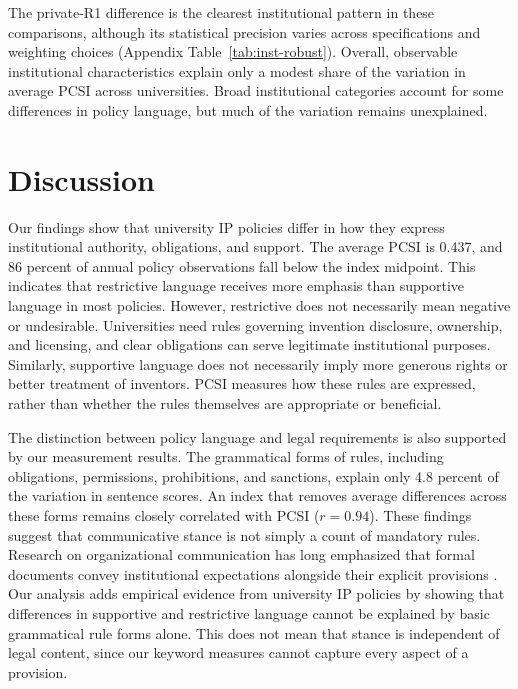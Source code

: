 \documentclass[11pt]{article}
\begin{document}


The private-R1 difference is the clearest institutional pattern in these comparisons, although its statistical precision varies across specifications and weighting choices (Appendix Table~\ref{tab:inst-robust}). Overall, observable institutional characteristics explain only a modest share of the variation in average PCSI across universities. Broad institutional categories account for some differences in policy language, but much of the variation remains unexplained.


\section{Discussion}\label{sec:discussion}

Our findings show that university IP policies differ in how they express institutional authority, obligations, and support. The average PCSI is 0.437, and 86 percent of annual policy observations fall below the index midpoint. This indicates that restrictive language receives more emphasis than supportive language in most policies. However, restrictive does not necessarily mean negative or undesirable. Universities need rules governing invention disclosure, ownership, and licensing, and clear obligations can serve legitimate institutional purposes. Similarly, supportive language does not necessarily imply more generous rights or better treatment of inventors. PCSI measures how these rules are expressed, rather than whether the rules themselves are appropriate or beneficial.

The distinction between policy language and legal requirements is also supported by our measurement results. The grammatical forms of rules, including obligations, permissions, prohibitions, and sanctions, explain only 4.8 percent of the variation in sentence scores. An index that removes average differences across these forms remains closely correlated with PCSI ($r=0.94$). These findings suggest that communicative stance is not simply a count of mandatory rules. Research on organizational communication has long emphasized that formal documents convey institutional expectations alongside their explicit provisions \citep{cooren2004textual,fairhurst2004organizations}. Our analysis adds empirical evidence from university IP policies by showing that differences in supportive and restrictive language cannot be explained by basic grammatical rule forms alone. This does not mean that stance is independent of legal content, since our keyword measures cannot capture every aspect of a provision.
\end{document}
